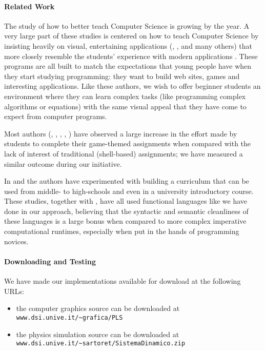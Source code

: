 \paragraph{Related Work}

The study of how to better teach Computer Science is growing by the year. A very large part of these studies is centered on how to teach Computer Science by insisting heavily on visual, entertaining applications (\cite{GAMES_AND_TRADITIONAL_CS}, \cite{POWER_AND_PERIL_GAME_TEACHING}, \cite{GAMES_FRESHMEN} and many others) that more closely resemble the students' experience with modern applications \cite{TEACHING_CS_THROUGH_GAMES}. These programs are all built to match the expectations that young people have when they start studying programming: they want to build web sites, games and interesting applications. Like these authors, we wish to offer beginner students an environment where they can learn complex tasks (like programming complex algorithms or equations) with the same visual appeal that they have come to expect from computer programs.

Most authors (\cite{GAME_DESIGN_AND_CS}, \cite{GAMES_FIRST_APPROACH}, \cite{GAME_PROG_INTRO}, \cite{GAME_PROG_FACULTY}, \cite{GAME_THEMED_CS1_2}) have observed a large increase in the effort made by students to complete their game-themed assignments when compared with the lack of interest of traditional (shell-based) assignments; we have measured a similar outcome during our initiative.

In \cite{FUN_IO} and \cite{SICSC} the authors have experimented with building a curriculum that can be used from middle- to high-schools and even in a university introductory course. These studies, together with \cite{PURELY_FUN_FIRST_YEAR}, have all used functional languages like we have done in our approach, believing that the syntactic and semantic cleanliness of these languages is a large bonus when compared to more complex imperative computational runtimes, especially when put in the hands of programming novices.

\paragraph{Downloading and Testing}

We have made our implementations available for download at the following URLs:
\begin{itemize}
\item the computer graphics source can be downloaded at \texttt{www.dsi.unive.it/\~{}grafica/PLS}
\item the physics simulation source can be downloaded at \texttt{www.dsi.unive.it/\~{}sartoret/SistemaDinamico.zip}
\end{itemize}
